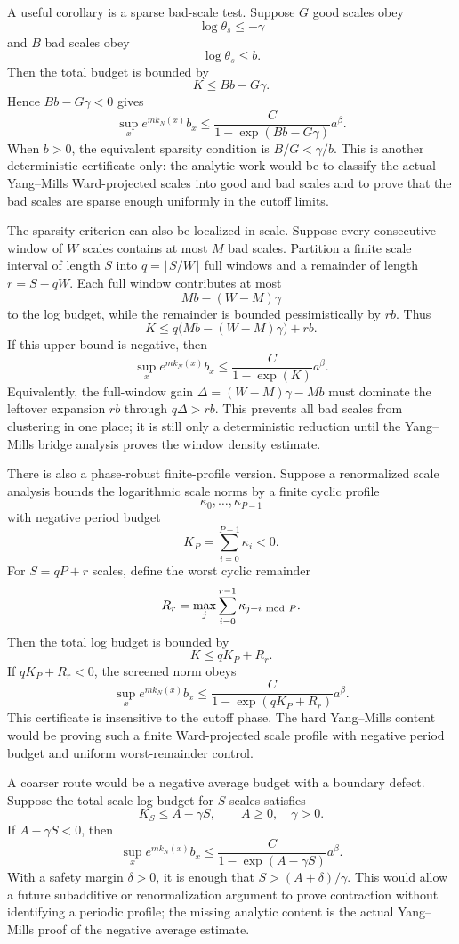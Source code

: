A useful corollary is a sparse bad-scale test. Suppose $G$ good scales obey
\[
  \log\theta_s\leq-\gamma
\]
and $B$ bad scales obey
\[
  \log\theta_s\leq b .
\]
Then the total budget is bounded by
\[
  K\leq Bb-G\gamma .
\]
Hence $Bb-G\gamma<0$ gives
\[
  \sup_x e^{m k_N(x)} b_x
  \leq
  \frac{C}{1-\exp(Bb-G\gamma)}a^\beta .
\]
When $b>0$, the equivalent sparsity condition is $B/G<\gamma/b$. This is
another deterministic certificate only: the analytic work would be to classify
the actual Yang--Mills Ward-projected scales into good and bad scales and to
prove that the bad scales are sparse enough uniformly in the cutoff limits.

The sparsity criterion can also be localized in scale. Suppose every
consecutive window of $W$ scales contains at most $M$ bad scales. Partition a
finite scale interval of length $S$ into $q=\lfloor S/W\rfloor$ full windows
and a remainder of length $r=S-qW$. Each full window contributes at most
\[
  Mb-(W-M)\gamma
\]
to the log budget, while the remainder is bounded pessimistically by $rb$.
Thus
\[
  K\leq q\bigl(Mb-(W-M)\gamma\bigr)+rb.
\]
If this upper bound is negative, then
\[
  \sup_x e^{m k_N(x)} b_x
  \leq
  \frac{C}{1-\exp(K)}a^\beta .
\]
Equivalently, the full-window gain
$\Delta=(W-M)\gamma-Mb$ must dominate the leftover expansion $rb$ through
$q\Delta>rb$. This prevents all bad scales from clustering in one place; it is
still only a deterministic reduction until the Yang--Mills bridge analysis
proves the window density estimate.

There is also a phase-robust finite-profile version. Suppose a renormalized
scale analysis bounds the logarithmic scale norms by a finite cyclic profile
\[
  \kappa_0,\ldots,\kappa_{P-1}
\]
with negative period budget
\[
  K_P=\sum_{i=0}^{P-1}\kappa_i<0 .
\]
For $S=qP+r$ scales, define the worst cyclic remainder
\[
  R_r=\max_j\sum_{i=0}^{r-1}\kappa_{j+i\ {\rm mod}\ P}.
\]
Then the total log budget is bounded by
\[
  K\leq qK_P+R_r .
\]
If $qK_P+R_r<0$, the screened norm obeys
\[
  \sup_x e^{m k_N(x)} b_x
  \leq
  \frac{C}{1-\exp(qK_P+R_r)}a^\beta .
\]
This certificate is insensitive to the cutoff phase. The hard Yang--Mills
content would be proving such a finite Ward-projected scale profile with
negative period budget and uniform worst-remainder control.

A coarser route would be a negative average budget with a boundary defect.
Suppose the total scale log budget for $S$ scales satisfies
\[
  K_S\leq A-\gamma S,\qquad A\geq0,\quad \gamma>0 .
\]
If $A-\gamma S<0$, then
\[
  \sup_x e^{m k_N(x)} b_x
  \leq
  \frac{C}{1-\exp(A-\gamma S)}a^\beta .
\]
With a safety margin $\delta>0$, it is enough that
$S>(A+\delta)/\gamma$. This would allow a future subadditive or
renormalization argument to prove contraction without identifying a periodic
profile; the missing analytic content is the actual Yang--Mills proof of the
negative average estimate.

